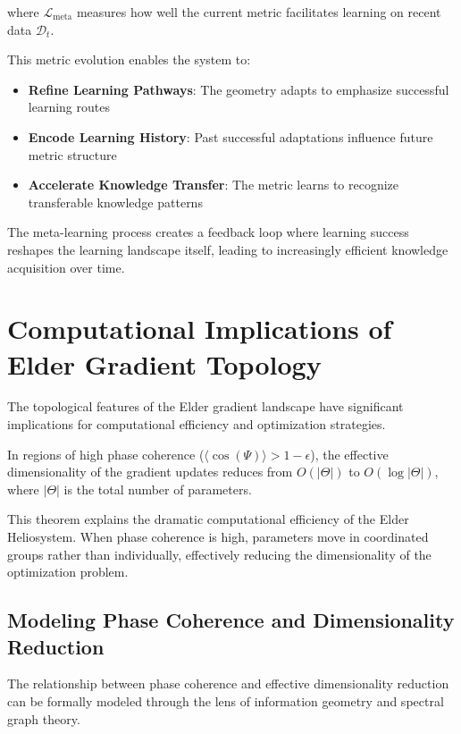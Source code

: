 where $\mathcal{L}_{\text{meta}}$ measures how well the current metric facilitates learning on recent data $\mathcal{D}_t$.

This metric evolution enables the system to:
\begin{itemize}
    \item \textbf{Refine Learning Pathways}: The geometry adapts to emphasize successful learning routes
    \item \textbf{Encode Learning History}: Past successful adaptations influence future metric structure
    \item \textbf{Accelerate Knowledge Transfer}: The metric learns to recognize transferable knowledge patterns
\end{itemize}

The meta-learning process creates a feedback loop where learning success reshapes the learning landscape itself, leading to increasingly efficient knowledge acquisition over time.

\section{Computational Implications of Elder Gradient Topology}

The topological features of the Elder gradient landscape have significant implications for computational efficiency and optimization strategies.

\begin{theorem}
In regions of high phase coherence ($\langle\cos(\Psi)\rangle > 1-\epsilon$), the effective dimensionality of the gradient updates reduces from $O(|\Theta|)$ to $O(\log|\Theta|)$, where $|\Theta|$ is the total number of parameters.
\end{theorem}

This theorem explains the dramatic computational efficiency of the Elder Heliosystem. When phase coherence is high, parameters move in coordinated groups rather than individually, effectively reducing the dimensionality of the optimization problem.

\subsection{Modeling Phase Coherence and Dimensionality Reduction}

The relationship between phase coherence and effective dimensionality reduction can be formally modeled through the lens of information geometry and spectral graph theory.

